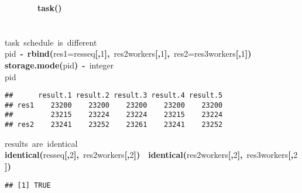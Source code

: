 \documentclass[a4paper,12pt]{article}\usepackage{graphicx, color}
\makeatletter
\newcommand{\hlnumber}[1]{\textcolor[rgb]{0,0,0}{#1}}%
\newcommand{\hlfunctioncall}[1]{\textcolor[rgb]{0.501960784313725,0,0.329411764705882}{\textbf{#1}}}%
\newcommand{\hlstring}[1]{\textcolor[rgb]{0.6,0.6,1}{#1}}%
\newcommand{\hlkeyword}[1]{\textcolor[rgb]{0,0,0}{\textbf{#1}}}%
\newcommand{\hlargument}[1]{\textcolor[rgb]{0.690196078431373,0.250980392156863,0.0196078431372549}{#1}}%
\newcommand{\hlcomment}[1]{\textcolor[rgb]{0.180392156862745,0.6,0.341176470588235}{#1}}%
\newcommand{\hlassignement}[1]{\textcolor[rgb]{0,0,0}{\textbf{#1}}}%
\newcommand{\hlsymbol}[1]{\textcolor[rgb]{0,0,0}{#1}}%
\newcommand{\hlstd}[1]{\textcolor[rgb]{0,0,0}{#1}}%
\newenvironment{kframe}{%
 \def\FrameCommand##1{\hskip\@totalleftmargin \hskip-\fboxsep
 \colorbox{shadecolor}{##1}\hskip-\fboxsep
     \hskip-\linewidth \hskip-\@totalleftmargin \hskip\columnwidth}%
 \MakeFramed {\advance\hsize-\width
   \@totalleftmargin\z@ \linewidth\hsize
   \@setminipage}}%
 {\par\unskip\endMakeFramed}
\newenvironment{knitrout}{}{} %
\renewenvironment{knitrout}{\begin{footnotesize}}{\end{footnotesize}}
\makeatother
\begin{document}
\begin{knitrout}
\begin{kframe}
\begin{flushleft}
\hlstd{}{\ }{\ }{\ }{\ }{\ }{\ }{\ }{\ }\hlfunctioncall{task}\hlkeyword{(}\hlkeyword{)}\hspace*{\fill}\\
\hlstd{}\hlkeyword{\usebox{\hlnormalsizeboxclosebrace}}\hspace*{\fill}\\
\hlstd{}\hspace*{\fill}\\
\hlstd{}\hlcomment{\usebox{\hlnormalsizeboxhash}{\ }task{\ }schedule{\ }is{\ }different}\hspace*{\fill}\\
\hlstd{}\hlsymbol{pid}{\ }\hlassignement{\usebox{\hlnormalsizeboxlessthan}-}{\ }\hlfunctioncall{rbind}\hlkeyword{(}\hlargument{res1}\hlargument{=}\hlsymbol{res\usebox{\hlnormalsizeboxunderscore}seq}\hlkeyword{[}\hlkeyword{,}\hlnumber{1}\hlkeyword{]}\hlkeyword{,}{\ }\hlsymbol{res\usebox{\hlnormalsizeboxunderscore}2workers}\hlkeyword{[}\hlkeyword{,}\hlnumber{1}\hlkeyword{]}\hlkeyword{,}{\ }\hlargument{res2}\hlargument{=}\hlsymbol{res\usebox{\hlnormalsizeboxunderscore}3workers}\hlkeyword{[}\hlkeyword{,}\hlnumber{1}\hlkeyword{]}\hlkeyword{)}\hspace*{\fill}\\
\hlstd{}\hlfunctioncall{storage.mode}\hlkeyword{(}\hlsymbol{pid}\hlkeyword{)}{\ }\hlassignement{\usebox{\hlnormalsizeboxlessthan}-}{\ }\hlstring{\usebox{\hlnormalsizeboxsinglequote}integer\usebox{\hlnormalsizeboxsinglequote}}\hspace*{\fill}\\
\hlstd{}\hlsymbol{pid}\mbox{}
\normalfont
\end{flushleft}
\begin{verbatim}
##      result.1 result.2 result.3 result.4 result.5
## res1    23200    23200    23200    23200    23200
##         23215    23224    23224    23215    23224
## res2    23241    23252    23261    23241    23252
\end{verbatim}
\begin{flushleft}
\ttfamily\noindent
\hlcomment{\usebox{\hlnormalsizeboxhash}{\ }results{\ }are{\ }identical}\hspace*{\fill}\\
\hlstd{}\hlfunctioncall{identical}\hlkeyword{(}\hlsymbol{res\usebox{\hlnormalsizeboxunderscore}seq}\hlkeyword{[}\hlkeyword{,}\hlnumber{2}\hlkeyword{]}\hlkeyword{,}{\ }\hlsymbol{res\usebox{\hlnormalsizeboxunderscore}2workers}\hlkeyword{[}\hlkeyword{,}\hlnumber{2}\hlkeyword{]}\hlkeyword{)}{\ }\hlkeyword{\usebox{\hlnormalsizeboxand}\usebox{\hlnormalsizeboxand}}{\ }\hlfunctioncall{identical}\hlkeyword{(}\hlsymbol{res\usebox{\hlnormalsizeboxunderscore}2workers}\hlkeyword{[}\hlkeyword{,}\hlnumber{2}\hlkeyword{]}\hlkeyword{,}{\ }\hlsymbol{res\usebox{\hlnormalsizeboxunderscore}3workers}\hlkeyword{[}\hlkeyword{,}\hlnumber{2}\hlkeyword{]}\hlkeyword{)}\mbox{}
\normalfont
\end{flushleft}
\begin{verbatim}
## [1] TRUE
\end{verbatim}
\end{kframe}
\end{knitrout}
\end{document}
